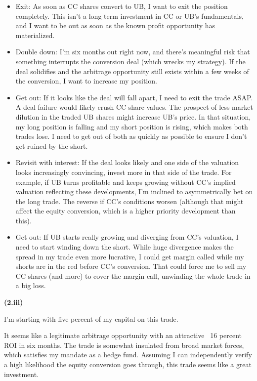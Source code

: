 \documentclass[11pt]{article}
\begin{document}
\begin{itemize}
  \item Exit: As soon as CC shares convert to UB, I want to exit the position completely. This isn't a long term investment in CC or UB's fundamentals, and I want to be out as soon as the known profit opportunity has materialized. 
  \item Double down: I'm six months out right now, and there's meaningful risk that something interrupts the conversion deal (which wrecks my strategy). If the deal solidifies and the arbitrage opportunity still exists within a few weeks of the conversion, I want to increase my position.
  \item Get out: If it looks like the deal will fall apart, I need to exit the trade ASAP. A deal failure would likely crush CC share values. The prospect of less market dilution in the traded UB shares might increase UB's price. In that situation, my long position is falling and my short position is rising, which makes both trades lose. I need to get out of both as quickly as possible to ensure I don't get ruined by the short.
  \item Revisit with interest: If the deal looks likely and one side of the valuation looks increasingly convincing, invest more in that side of the trade. For example, if UB turns profitable and keeps growing without CC's implied valuation reflecting these developments, I'm inclined to asymmetrically bet on the long trade. The reverse if CC's conditions worsen (although that might affect the equity conversion, which is a higher priority development than this).
  \item Get out: If UB starts really growing and diverging from CC's valuation, I need to start winding down the short. While huge divergence makes the spread in my trade even more lucrative, I could get margin called while my shorts are in the red before CC's conversion. That could force me to sell my CC shares (and more) to cover the margin call, unwinding the whole trade in a big loss.
\end{itemize}

\textbf{(2.iii)}

I'm starting with five percent of my capital on this trade. 

It seems like a legitimate arbitrage opportunity with an attractive ~16 percent ROI in six months. The trade is somewhat insulated from broad market forces, which satisfies my mandate as a hedge fund. Assuming I can independently verify a high likelihood the equity conversion goes through, this trade seems like a great investment.
\end{document}
